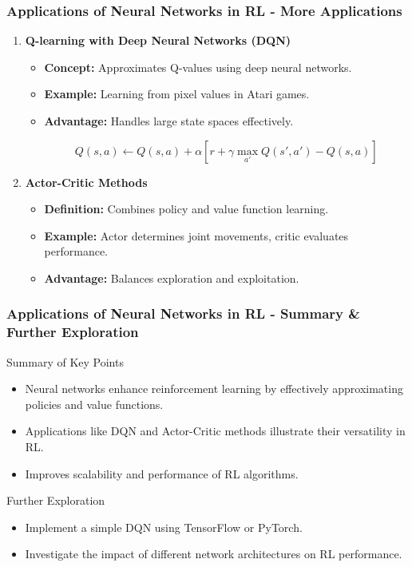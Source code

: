 \documentclass[aspectratio=169]{beamer}
\begin{document}
\begin{frame}[fragile]
    \frametitle{Applications of Neural Networks in RL - More Applications}
    \begin{enumerate}[resume]
        \item \textbf{Q-learning with Deep Neural Networks (DQN)}
            \begin{itemize}
                \item \textbf{Concept:} Approximates Q-values using deep neural networks.
                \item \textbf{Example:} Learning from pixel values in Atari games.
                \item \textbf{Advantage:} Handles large state spaces effectively.
                
                \begin{equation}
                    Q(s,a) \leftarrow Q(s,a) + \alpha [r + \gamma \max_{a'} Q(s',a') - Q(s,a)]
                \end{equation}
            \end{itemize}

        \item \textbf{Actor-Critic Methods}
            \begin{itemize}
                \item \textbf{Definition:} Combines policy and value function learning.
                \item \textbf{Example:} Actor determines joint movements, critic evaluates performance.
                \item \textbf{Advantage:} Balances exploration and exploitation.
            \end{itemize}
    \end{enumerate}
\end{frame}

\begin{frame}[fragile]
    \frametitle{Applications of Neural Networks in RL - Summary & Further Exploration}
    \begin{block}{Summary of Key Points}
        \begin{itemize}
            \item Neural networks enhance reinforcement learning by effectively approximating policies and value functions.
            \item Applications like DQN and Actor-Critic methods illustrate their versatility in RL.
            \item Improves scalability and performance of RL algorithms.
        \end{itemize}
    \end{block}
    
    \begin{block}{Further Exploration}
        \begin{itemize}
            \item Implement a simple DQN using TensorFlow or PyTorch.
            \item Investigate the impact of different network architectures on RL performance.
        \end{itemize}
    \end{block}
\end{frame}
\end{document}
